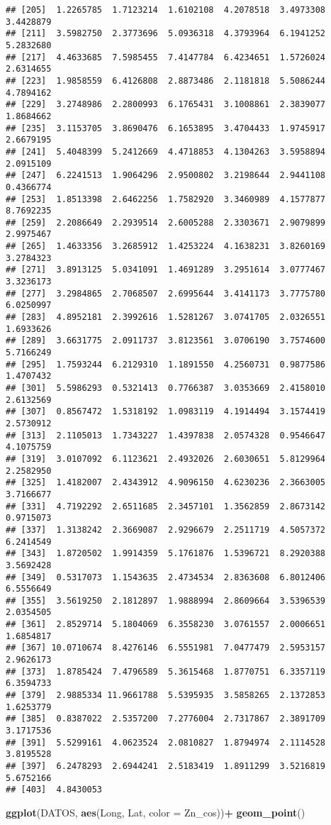 \documentclass[
]{article}
\newenvironment{Shaded}{\begin{snugshade}}{\end{snugshade}}
\newcommand{\DataTypeTok}[1]{\textcolor[rgb]{0.13,0.29,0.53}{#1}}
\newcommand{\KeywordTok}[1]{\textcolor[rgb]{0.13,0.29,0.53}{\textbf{#1}}}
\newcommand{\NormalTok}[1]{#1}
\newcommand{\OperatorTok}[1]{\textcolor[rgb]{0.81,0.36,0.00}{\textbf{#1}}}
\newcommand{\StringTok}[1]{\textcolor[rgb]{0.31,0.60,0.02}{#1}}
\begin{document}
\begin{verbatim}
## [205]  1.2265785  1.7123214  1.6102108  4.2078518  3.4973308  3.4428879
## [211]  3.5982750  2.3773696  5.0936318  4.3793964  6.1941252  5.2832680
## [217]  4.4633685  7.5985455  7.4147784  6.4234651  1.5726024  2.6314655
## [223]  1.9858559  6.4126808  2.8873486  2.1181818  5.5086244  4.7894162
## [229]  3.2748986  2.2800993  6.1765431  3.1008861  2.3839077  1.8684662
## [235]  3.1153705  3.8690476  6.1653895  3.4704433  1.9745917  2.6679195
## [241]  5.4048399  5.2412669  4.4718853  4.1304263  3.5958894  2.0915109
## [247]  6.2241513  1.9064296  2.9500802  3.2198644  2.9441108  0.4366774
## [253]  1.8513398  2.6462256  1.7582920  3.3460989  4.1577877  8.7692235
## [259]  2.2086649  2.2939514  2.6005288  2.3303671  2.9079899  2.9975467
## [265]  1.4633356  3.2685912  1.4253224  4.1638231  3.8260169  3.2784323
## [271]  3.8913125  5.0341091  1.4691289  3.2951614  3.0777467  3.3236173
## [277]  3.2984865  2.7068507  2.6995644  3.4141173  3.7775780  6.0250997
## [283]  4.8952181  2.3992616  1.5281267  3.0741705  2.0326551  1.6933626
## [289]  3.6631775  2.0911737  3.8123561  3.0706190  3.7574600  5.7166249
## [295]  1.7593244  6.2129310  1.1891550  4.2560731  0.9877586  1.4707432
## [301]  5.5986293  0.5321413  0.7766387  3.0353669  2.4158010  2.6132569
## [307]  0.8567472  1.5318192  1.0983119  4.1914494  3.1574419  2.5730912
## [313]  2.1105013  1.7343227  1.4397838  2.0574328  0.9546647  4.1075759
## [319]  3.0107092  6.1123621  2.4932026  2.6030651  5.8129964  2.2582950
## [325]  1.4182007  2.4343912  4.9096150  4.6230236  2.3663005  3.7166677
## [331]  4.7192292  2.6511685  2.3457101  1.3562859  2.8673142  0.9715073
## [337]  1.3138242  2.3669087  2.9296679  2.2511719  4.5057372  6.2414549
## [343]  1.8720502  1.9914359  5.1761876  1.5396721  8.2920388  3.5692428
## [349]  0.5317073  1.1543635  2.4734534  2.8363608  6.8012406  6.5556649
## [355]  3.5619250  2.1812897  1.9888994  2.8609664  3.5396539  2.0354505
## [361]  2.8529714  5.1804069  6.3558230  3.0761557  2.0006651  1.6854817
## [367] 10.0710674  8.4276146  6.5551981  7.0477479  2.5953157  2.9626173
## [373]  1.8785424  7.4796589  5.3615468  1.8770751  6.3357119  6.3594733
## [379]  2.9885334 11.9661788  5.5395935  3.5858265  2.1372853  1.6253779
## [385]  0.8387022  2.5357200  7.2776004  2.7317867  2.3891709  3.1717536
## [391]  5.5299161  4.0623524  2.0810827  1.8794974  2.1114528  3.8195528
## [397]  6.2478293  2.6944241  2.5183419  1.8911299  3.5216819  5.6752166
## [403]  4.8430053
\end{verbatim}

\begin{Shaded}
\begin{Highlighting}[]
\KeywordTok{ggplot}\NormalTok{(DATOS, }\KeywordTok{aes}\NormalTok{(Long, Lat, }\DataTypeTok{color =}\NormalTok{ Zn_cos))}\OperatorTok{+}
\StringTok{  }\KeywordTok{geom_point}\NormalTok{()}
\end{Highlighting}
\end{Shaded}
\end{document}
